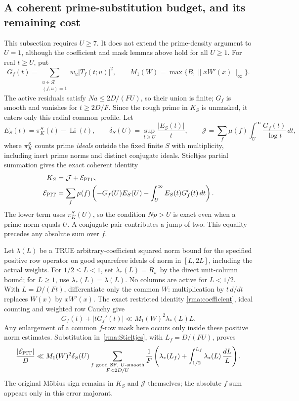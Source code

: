 \subsection{A coherent prime-substitution budget, and its remaining cost}
This subsection requires $U\ge7$. It does not extend the prime-density
argument to $U=1$, although the coefficient and mask lemmas above hold
for all $U\ge1$. For real $t\ge U$, put
\[
 G_f(t)=\sum_{\substack{u\in\mathcal R\\(f,u)=1}}
                      w_u|T_f(t;u)|^2,
 \qquad M_1(W)=\max\{B,\|xW'(x)\|_\infty\}.
\]
The active residuals satisfy $Na\le2D/(FU)$, so their union is finite;
$G_f$ is smooth and vanishes for $t\ge2D/F$. Since the rough prime in
$K_S$ is unmasked, it enters only this radial common profile. Let
\[
 E_S(t)=\pi_K^S(t)-\operatorname{Li}(t),\qquad
 \delta_S(U)=\sup_{t\ge U}\frac{|E_S(t)|}{t},
 \qquad
 \mathcal J=\sum_f\mu(f)\int_U^\infty\frac{G_f(t)}{\log t}\,dt,
\]
where $\pi_K^S$ counts prime \emph{ideals} outside the fixed finite $S$ with
multiplicity, including inert prime norms and distinct conjugate ideals. Stieltjes partial
summation gives the exact coherent identity
\begin{equation}\label{rma:Stieltjes}
 \begin{aligned}
 K_S&=\mathcal J+\mathcal E_{\rm PIT},\\
 \mathcal E_{\rm PIT}
 &=\sum_f\mu(f)\left(-G_f(U)E_S(U)
          -\int_U^\infty E_S(t)G_f'(t)\,dt\right).
 \end{aligned}
\end{equation}
The lower term uses $\pi_K^S(U)$, so the condition $Np>U$ is exact even
when a prime norm equals $U$. A conjugate pair contributes a jump of
two. This equality precedes any absolute sum over $f$.

Let $\lambda(L)$ be a TRUE arbitrary-coefficient squared norm bound for
the specified positive row operator on good squarefree ideals of norm
in $[L,2L]$, including the actual weights. For $1/2\le L<1$, set
$\lambda_*(L)=R_w$ by the direct unit-column bound; for $L\ge1$, use
$\lambda_*(L)=\lambda(L)$. No columns are active for $L<1/2$.
With $L=D/(Ft)$, differentiate only the common $W$: multiplication by
$t\,d/dt$ replaces $W(x)$ by $xW'(x)$. The exact restricted identity
\eqref{rma:coefficient}, ideal counting and weighted row Cauchy give
\[
 G_f(t)+|tG_f'(t)|\ll M_1(W)^2\lambda_*(L)L.
\]
Any enlargement of a common $f$-row mask here occurs only inside these
positive norm estimates. Substitution in~\eqref{rma:Stieltjes}, with
$L_f=D/(FU)$, proves
\begin{equation}\label{rma:PIT-variation}
 \frac{|\mathcal E_{\rm PIT}|}{D}
 \ll M_1(W)^2\delta_S(U)
 \sum_{\substack{f\ \mathrm{good\ SF},\ U\text{-smooth}\\F<2D/U}}
 \frac1F\left(\lambda_*(L_f)
       +\int_{1/2}^{L_f}\lambda_*(L)\,\frac{dL}{L}\right).
\end{equation}
The original M\"obius sign remains in $K_S$ and $\mathcal J$ themselves;
the absolute $f$ sum appears only in this error majorant.

